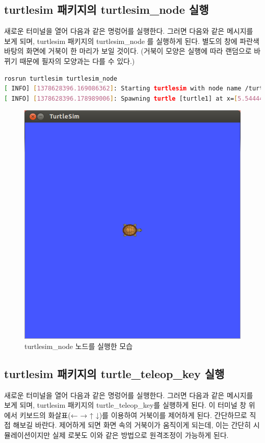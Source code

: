 \subsection{turtlesim 패키지의 turtlesim\_node 실행}
새로운 터미널을 열어 다음과 같은 명렁어를 실행한다. 그러면 다음와 같은 메시지를 보게 되며, turtlesim 패키지의 turtlesim\_node 를 실행하게 된다. 별도의 창에 파란색 바탕의 화면에 거북이 한 마리가 보일 것이다. (거북이 모양은 실행에 따라 랜덤으로 바뀌기 때문에 필자의 모양과는 다를 수 있다.)

\begin{lstlisting}[language=bash]
rosrun turtlesim turtlesim_node
[ INFO] [1378628396.169086362]: Starting turtlesim with node name /turtlesim
[ INFO] [1378628396.178989006]: Spawning turtle [turtle1] at x=[5.544445], y=[5.544445], theta=[0.000000]
\end{lstlisting}

\begin{figure}[h]
\centering\includegraphics[width=0.5\columnwidth]{pictures/chapter2/turtlesim_node.png}
\caption{turtlesim\_node 노드를 실행한 모습}
\end{figure}

\subsection{turtlesim 패키지의 turtle\_teleop\_key 실행}
새로운 터미널을 열어 다음과 같은 명렁어를 실행한다. 그러면 다음과 같은 메시지를 보게 되며, turtlesim 패키지의 turtle\_teleop\_key를 실행하게 된다. 이 터미널 창 위에서 키보드의 화살표(← → ↑ ↓)를 이용하여 거북이를 제어하게 된다. 간단하므로 직접 해보길 바란다. 제어하게 되면 화면 속의 거북이가 움직이게 되는데, 이는 간단히 시뮬레이션이지만 실제 로봇도 이와 같은 방법으로 원격조정이 가능하게 된다.

